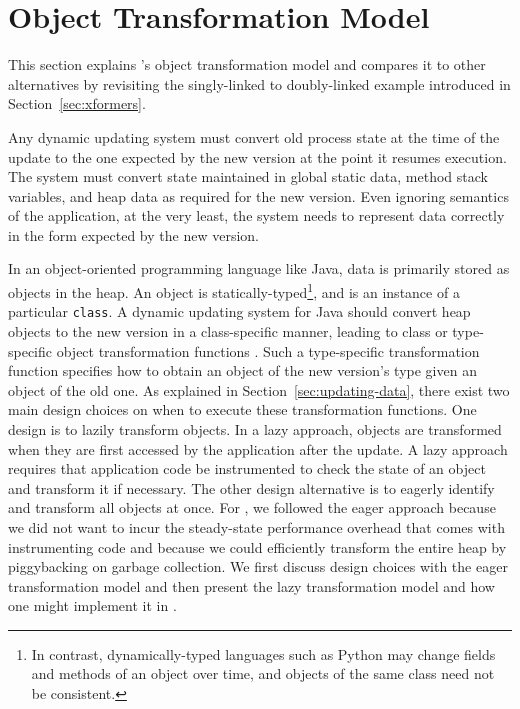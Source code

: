 
\section{Object Transformation Model}
\label{sec:transformer-model}


This section explains \JV's object transformation model and compares it to
other alternatives by revisiting the singly-linked to doubly-linked example
introduced in Section~\ref{sec:xformers}.


Any dynamic updating system must convert old process state at
the time of the update to the one expected by the new version at the point it
resumes execution. The system must convert state maintained in global
static data, method stack variables, and heap data as required for the new
version. Even ignoring semantics of the application, at the very least, the
system needs to represent data correctly in the form expected by the new
version.

In an object-oriented programming language like Java, data is primarily
stored as objects in the heap. An object is statically-typed\footnote{In
contrast, dynamically-typed languages such as Python may change fields
and methods of an object over time, and objects of the same class
need not be consistent.}, and is an instance of a particular {\tt class}.
A dynamic updating system for Java should convert heap objects to the new version in a
class-specific manner, leading to class or type-specific
object transformation functions \cite{neamtiu06dsu, K42reconfig}.
Such a type-specific transformation function specifies how to obtain an
object of the new version's type given an object of the old one. As
explained in Section~\ref{sec:updating-data}, there exist two main design
choices on when to execute these transformation functions. One design is to
lazily transform objects. In a lazy approach, objects are transformed when
they are first accessed by the application after the update. A lazy
approach requires that application code be instrumented to check the state
of an object and transform it if necessary. The other design alternative is
to eagerly identify and transform all objects at once. For \JV, we followed
the eager approach because we did not want to incur the steady-state
performance overhead that comes with instrumenting code and because we
could efficiently transform the entire heap by piggybacking on garbage collection. We
first discuss design choices with the eager transformation model and then
present the lazy transformation model and how one might implement it in
\JV.

